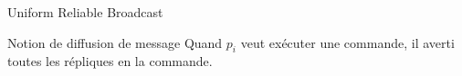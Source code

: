 
\begingroup

\begin{frame}{Uniform Reliable Broadcast}

  \begin{block}{Notion de diffusion de message}
    Quand $p_i$ veut exécuter une commande, il averti toutes les répliques en  la commande.
    \begin{algorithm}[H]
    \end{algorithm}
  \end{block}
  
\end{frame}

\endgroup
\endinput
